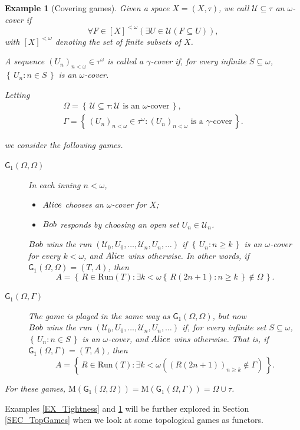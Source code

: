 \documentclass[12pt]{amsart}
\newtheorem{ex}[thm]{Example}
\theoremstyle{definition}
\newcommand{\set}[1]{\left\{\, {#1} \,\right\}}
\newcommand{\seq}[1]{{\left( {#1} \right)}}
\newcommand{\W}{{\Omega}}
\newcommand{\g}{\mathsf{G}}
\newcommand{\ali}{\textup{\textmd{\textsc{Alice}}}}
\newcommand{\bob}{\textup{\textmd{\textsc{Bob}}}}
\newcommand{\Run}{{\mathrm{Run}}}
\newcommand{\M}{\mathrm{M}}
\newcommand{\mU}{{\mathcal{U}}}
\begin{document}
\begin{ex}[Covering games]\label{EX_Covering}
	Given a space $X=(X,\tau)$, we call $\mU\subseteq \tau$ an \emph{$\omega$-cover} if 
	\[
	\forall F\in [X]^{<\omega}(\exists U\in\mU(F\subseteq U)),
	\] 
	with $[X]^{<\omega}$ denoting the set of finite subsets of $X$.
	
	A sequence $(U_n)_{n<\omega}\in \tau^{\omega}$ is called a $\gamma$-cover if, for every infinite $S\subseteq \omega$, $\set{U_n:n\in S}$ is an $\omega$-cover.
	
	Letting
	\begin{gather*}
		\W=\set{\mU\subseteq \tau: \mU \text{ is an $\omega$-cover}},\\
		\Gamma = \set{(U_n)_{n<\omega}\in \tau^\omega: (U_n)_{n<\omega} \text{ is a $\gamma$-cover}}.
	\end{gather*}
	
	we consider the following games.
	\begin{description}
		\item[$\g_1(\W,\W)$] In each inning $n<\omega$,
		\begin{itemize}
			\item $\ali$ chooses an $\omega$-cover for $X$;
			\item $\bob$ responds by choosing an open set $U_n\in\mU_n$.
		\end{itemize} 
		$\bob$ wins the run $\seq{\mU_0,U_0,\dotsc, \mU_n,U_n,\dotsc}$ if $\set{U_n:n\ge k}$ is an $\omega$-cover for every $k<\omega$, and $\ali$ wins otherwise. In other words, if $\g_1(\W,\W) = (T,A)$, then 
		\[
		A = \set{R\in \Run(T): \exists k<\omega \set{R(2n+1):n\ge k}\notin \W}.
		\]
		
		\item[$\g_1(\W,\Gamma)$] The game is played in the same way as $\g_1(\W,\W)$, but now\\  $\bob$ wins the run $\seq{\mU_0,U_0,\dotsc, \mU_n,U_n,\dotsc}$ if, for every infinite set $S\subseteq\omega$, $\set{U_n:n\in S}$ is an $\omega$-cover, 
		and $\ali$ wins otherwise.	That is, if $\g_1(\W,\Gamma) = (T,A)$, then 
		\[
		A = \set{R\in \Run(T): \exists k<\omega \left((R(2n+1))_{n\ge k}\notin \Gamma\right)}.
		\]
		
	\end{description}
	For these games, $\M(\g_1(\W,\W)) = \M(\g_1(\W,\Gamma)) = \W\cup \tau$.
\end{ex}


Examples \ref{EX_Tightness} and \ref{EX_Covering} will be further explored in Section \ref{SEC_TopGames} when we look at some topological games as functors. 
\end{document}
